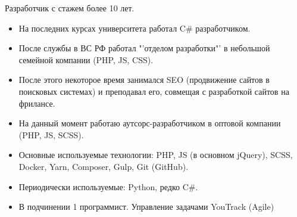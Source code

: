\documentclass[10pt]{tpl/developercv} %
\begin{document}
\vspace{0.5cm}




\begin{minipage}[t]{0.45\textwidth} %
	\vspace{-\baselineskip} %

	Разработчик с стажем более 10 лет.
  \bigskip
  \small{
    \begin{itemize}[leftmargin=0pt,rightmargin=0]
      \item На последних курсах университета работал C\# разработчиком.
      \item После службы в ВС РФ работал "'отделом разработки"' в небольшой семейной компании (PHP, JS, CSS).
      \item После этого некоторое время занимался SEO (продвижение сайтов в поисковых системах) и преподавал его, совмещая с разработкой сайтов на фрилансе.
      \item На данный момент работаю аутсорс-разработчиком в оптовой компании (PHP, JS, SCSS).
      \item Основные используемые технологии: PHP, JS (в основном jQuery), SCSS, Docker, Yarn, Composer, Gulp, {Git (GitHub)}.
      \item Периодически используемые: Python, редко C\#.
      \item В подчинении 1 программист. Управление задачами YouTrack (Agile)
    \end{itemize}
  }
\end{minipage}
\hfill %
\begin{minipage}[t]{0.5\textwidth} %
	\vspace{-\baselineskip} %
	\begin{barchart}{5.5}
	\end{barchart}
\end{minipage}

\end{document}
